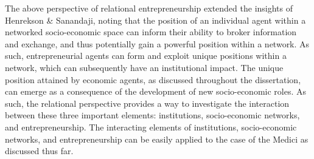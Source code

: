 The above perspective of relational entrepreneurship extended the insights of Henrekson \& Sanandaji, noting that the position of an individual agent within a networked socio-economic space can inform their ability to broker information and exchange, and thus potentially gain a powerful position within a network. As such, entrepreneurial agents can form and exploit unique positions within a network, which can subsequently have an institutional impact. The unique position attained by economic agents, as discussed throughout the dissertation, can emerge as a consequence of the development of new socio-economic roles. As such, the relational perspective provides a way to investigate the interaction between these three important elements: institutions, socio-economic networks, and entrepreneurship. The interacting elements of institutions, socio-economic networks, and entrepreneurship can be easily applied to the case of the Medici as discussed thus far.



